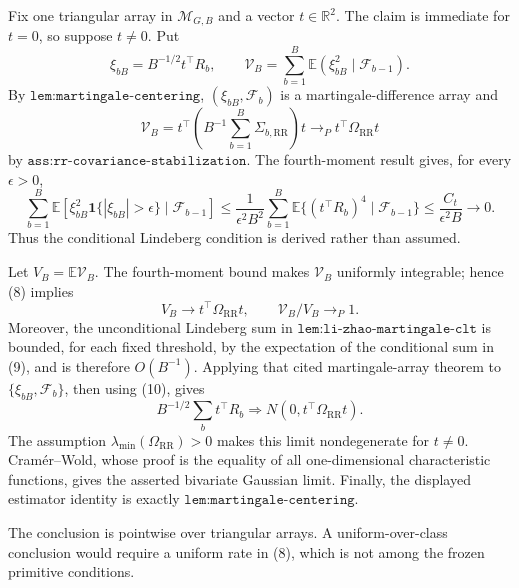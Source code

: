 Fix one triangular array in \(\mathcal M_{G,B}\) and a vector \(t\in\mathbb R^2\).  The claim is immediate for \(t=0\), so suppose \(t\neq0\).  Put
\[
 \xi_{bB}=B^{-1/2}t^\top R_b,
 \qquad \mathcal V_B=\sum_{b=1}^B
 \mathbb E(\xi_{bB}^2\mid\mathcal F_{b-1}).
\]
By \(\texttt{lem:martingale-centering}\), \((\xi_{bB},\mathcal F_b)\) is a martingale-difference array and
\[
 \mathcal V_B
 =t^\top\left(B^{-1}\sum_{b=1}^B\Sigma_{b,\mathrm{RR}}\right)t
 \longrightarrow_P t^\top\Omega_{\mathrm{RR}}t                 \tag{8}
\]
by \(\texttt{ass:rr-covariance-stabilization}\).  The fourth-moment result gives, for every \(\epsilon>0\),
\[
 \sum_{b=1}^B\mathbb E\!\left[
   \xi_{bB}^2\mathbf1\{|\xi_{bB}|>\epsilon\}
   \mid\mathcal F_{b-1}\right]
 \leq\frac1{\epsilon^2B^2}\sum_{b=1}^B
       \mathbb E\{(t^\top R_b)^4\mid\mathcal F_{b-1}\}
 \leq\frac{C_t}{\epsilon^2B}\longrightarrow0.                 \tag{9}
\]
Thus the conditional Lindeberg condition is derived rather than assumed.

Let \(V_B=\mathbb E\mathcal V_B\).  The fourth-moment bound makes \(\mathcal V_B\) uniformly integrable; hence (8) implies
\[
 V_B\longrightarrow t^\top\Omega_{\mathrm{RR}}t,
 \qquad \mathcal V_B/V_B\longrightarrow_P1.                    \tag{10}
\]
Moreover, the unconditional Lindeberg sum in \(\texttt{lem:li-zhao-martingale-clt}\) is bounded, for each fixed threshold, by the expectation of the conditional sum in (9), and is therefore \(O(B^{-1})\).  Applying that cited martingale-array theorem to \(\{\xi_{bB},\mathcal F_b\}\), then using (10), gives
\[
 B^{-1/2}\sum_bt^\top R_b
 \Rightarrow N(0,t^\top\Omega_{\mathrm{RR}}t).
\]
The assumption \(\lambda_{\min}(\Omega_{\mathrm{RR}})>0\) makes this limit nondegenerate for \(t\neq0\).  Cram\'er--Wold, whose proof is the equality of all one-dimensional characteristic functions, gives the asserted bivariate Gaussian limit.  Finally, the displayed estimator identity is exactly \(\texttt{lem:martingale-centering}\).

The conclusion is pointwise over triangular arrays.  A uniform-over-class conclusion would require a uniform rate in (8), which is not among the frozen primitive conditions.